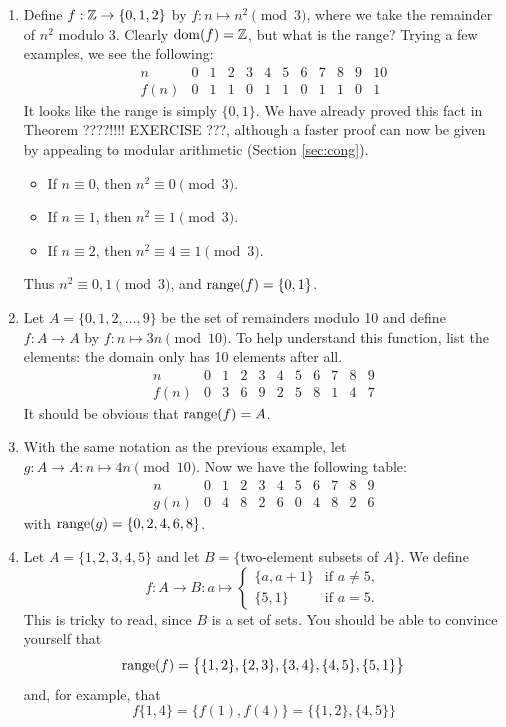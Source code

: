 \begin{examples}{}{}
\begin{enumerate}
  \item Define $f:\mathbb{Z}\to\{0,1,2\}$ by $f:n\mapsto n^2\pmod 3$, where we take the remainder of $n^2$ modulo 3. Clearly $\operatorname{dom}(f)=\mathbb{Z}$, but what is the range? Trying a few examples, we see the following:
  \[\begin{array}{c|ccccccccccc}
  n&0&1&2&3&4&5&6&7&8&9&10\\\hline
  f(n)&0&1&1&0&1&1&0&1&1&0&1
  \end{array}\]
  It looks like the range is simply $\{0,1\}$. We have already proved this fact in Theorem ????!!!! EXERCISE ???, although a faster proof can now be given by appealing to modular arithmetic (Section \ref{sec:cong}).
  \begin{itemize}\setlength{\itemsep}{0pt}
    \item[] If $n\equiv 0$, then $n^2\equiv 0\pmod 3$.
    \item[] If $n\equiv 1$, then $n^2\equiv 1\pmod 3$.
    \item[] If $n\equiv 2$, then $n^2\equiv 4\equiv 1\pmod 3$.
  \end{itemize}
  Thus $n^2\equiv 0,1\pmod 3$, and $\operatorname{range}(f)=\{0,1\}$.
  \item\label{ex:functmod1} Let $A=\{0,1,2,\ldots,9\}$ be the set of remainders modulo 10 and define $f:A\to A$ by $f:n\mapsto 3n\pmod{10}$. To help understand this function, list the elements: the domain only has 10 elements after all.
  \[\begin{array}{c|cccccccccc}
  n&0&1&2&3&4&5&6&7&8&9\\\hline
  f(n)&0&3&6&9&2&5&8&1&4&7
  \end{array}\]
  It should be obvious that $\operatorname{range}(f)=A$.
  \item\label{ex:functmod2} With the same notation as the previous example, let $g:A\to A:n\mapsto 4n\pmod{10}$. Now we have the following table:
  \[\begin{array}{c|cccccccccc}
  n&0&1&2&3&4&5&6&7&8&9\\\hline
  g(n)&0&4&8&2&6&0&4&8&2&6
  \end{array}\]
  with $\operatorname{range}(g)=\{0,2,4,6,8\}$.
  \item Let $A=\{1,2,3,4,5\}$ and let $B=\{$two-element subsets of $A\}$. We define
  \[f:A\to B:a\mapsto\begin{cases}
  \{a,a+1\}&\text{if }a\neq 5,\\
  \{5,1\}&\text{if }a=5.
  \end{cases}\]
  This is tricky to read, since $B$ is a set of sets. You should be able to convince yourself that
  \[\operatorname{range}(f)=\big\{\{1,2\},\{2,3\},\{3,4\},\{4,5\},\{5,1\}\big\}\]
  and, for example, that
  \[f\big\{1,4\big\}=\big\{f(1),f(4)\big\}=\big\{\{1,2\},\{4,5\}\big\}\]
\end{enumerate}
\end{examples}


